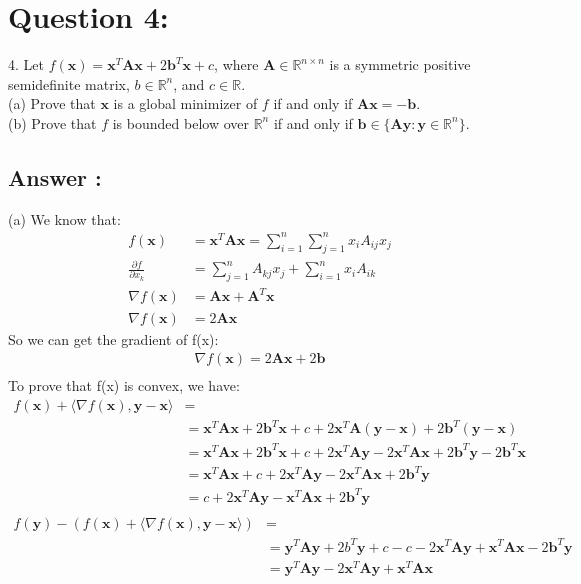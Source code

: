 \documentclass[a4paper,12pt]{article}
\newcommand{\R}{\mathbb{R}}
\begin{document}
\section*{Question 4:}
4. Let \(f(\bm{x}) = \bm{x}^T\bm{A}\bm{x} + 2\bm{b}^T\bm{x} + c\), where \(\bm{A} \in \R^{n \times n}\) is a symmetric positive semidefinite matrix, \(b \in \R^n\), and \(c \in \R\). \\
(a) Prove that \(\bm{x}\) is a global minimizer of \(f\) if and only if \(\bm{A}\bm{x} = -\bm{b}\). \\
(b) Prove that \(f\) is bounded below over \(\R^n\) if and only if \(\bm{b} \in \{\bm{A}\bm{y}: \bm{y} \in \R^n\}\). \\
\subsection*{Answer :}
(a) We know that:
\begin{align*}
    f(\bm{x}) &= \bm{x}^T\bm{A}\bm{x} = \sum_{i=1}^n \sum_{j = 1}^n x_i A_{ij} x_j \\
    \frac {\partial f}{\partial x_k} &= \sum_{j=1}^{n}A_{kj}x_j + \sum_{i = 1}^{n}x_iA_{ik} \\
    \nabla f(\bm{x}) &= \bm{A}\bm{x} + \bm{A}^T\bm{x}\\ 
    \nabla f(\bm{x}) &= 2\bm{A}\bm{x}
\end{align*}
So we can get the gradient of f(x):
\begin{align*}
    \nabla f(\bm{x}) = 2\bm{A}\bm{x} + 2\bm{b} \\
\end{align*}
To prove that f(x) is convex, we have:
\begin{align*}
    f(\bm{x}) + \langle \nabla f(\bm{x}), \bm{y} - \bm{x}\rangle &=  \\
    &= \bm{x}^T\bm{A}\bm{x} + 2\bm{b}^T\bm{x} + c + 2\bm{x}^T\bm{A}(\bm{y} - \bm{x}) + 2\bm{b}^T(\bm{y} - \bm{x}) \\
    &= \bm{x}^T\bm{A}\bm{x} + 2\bm{b}^T\bm{x} + c + 2\bm{x}^T\bm{A}\bm{y} - 2\bm{x}^T\bm{A}\bm{x} + 2\bm{b}^T\bm{y} - 2\bm{b}^T\bm{x} \\
    &= \bm{x}^T\bm{A}\bm{x} + c + 2\bm{x}^T\bm{A}\bm{y} - 2\bm{x}^T\bm{A}\bm{x} + 2\bm{b}^T\bm{y} \\
    &= c + 2\bm{x}^T\bm{A}\bm{y} - \bm{x}^T\bm{A}\bm{x} + 2\bm{b}^T\bm{y} \\
\end{align*}
\begin{align*}
    f(\bm{y}) - (f(\bm{x} )+ \langle \nabla f(\bm{x}), \bm{y} - \bm{x}\rangle) &=  \\
    &= \bm{y}^T\bm{A}\bm{y} + 2b^T\bm{y} + c - c - 2\bm{x}^T\bm{A}\bm{y} + \bm{x}^T\bm{A}\bm{x} - 2\bm{b}^T\bm{y} \\
    &= \bm{y}^T\bm{A}\bm{y} - 2\bm{x}^T\bm{A}\bm{y} + \bm{x}^T\bm{A}\bm{x}  \\
\end{align*}
\end{document}
